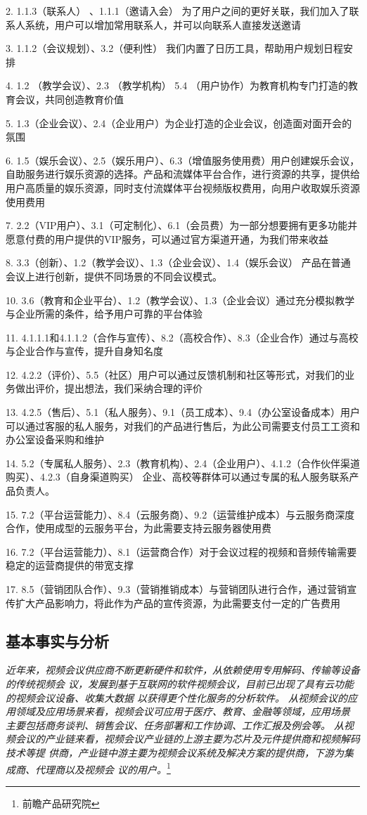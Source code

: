 \documentclass[a4paper,12pt]{article}
\begin{document}
    2. 1.1.3（联系人） 、1.1.1（邀请入会） 为了用户之间的更好关联，我们加入了联系人系统，用户可以增加常用联系人，并可以向联系人直接发送邀请

    3. 1.1.2（会议规划）、3.2（便利性） 我们内置了日历工具，帮助用户规划日程安排

    4. 1.2 （教学会议）、2.3 （教学机构） 5.4 （用户协作）为教育机构专门打造的教育会议，共同创造教育价值

    5. 1.3（企业会议）、2.4（企业用户）为企业打造的企业会议，创造面对面开会的氛围

    6. 1.5（娱乐会议）、2.5（娱乐用户）、6.3（增值服务使用费）用户创建娱乐会议，自助服务进行娱乐资源的选择。产品和流媒体平台合作，进行资源的共享，提供给用户高质量的娱乐资源，同时支付流媒体平台视频版权费用，向用户收取娱乐资源使用费用

    7. 2.2（VIP用户）、3.1（可定制化）、6.1（会员费）为一部分想要拥有更多功能并愿意付费的用户提供的VIP服务，可以通过官方渠道开通，为我们带来收益

    8. 3.3（创新）、1.2（教学会议）、1.3（企业会议）、1.4（娱乐会议） 产品在普通会议上进行创新，提供不同场景的不同会议模式。

    10. 3.6（教育和企业平台）、1.2（教学会议）、1.3（企业会议）通过充分模拟教学与企业所需的条件，给予用户可靠的平台体验

    11. 4.1.1.1和4.1.1.2（合作与宣传）、8.2（高校合作）、8.3（企业合作）通过与高校与企业合作与宣传，提升自身知名度

    12. 4.2.2（评价）、5.5（社区）用户可以通过反馈机制和社区等形式，对我们的业务做出评价，提出想法，我们采纳合理的评价

    13. 4.2.5（售后）、5.1（私人服务）、9.1（员工成本）、9.4（办公室设备成本）用户可以通过客服的私人服务，对我们的产品进行售后，为此公司需要支付员工工资和办公室设备采购和维护

    14. 5.2（专属私人服务）、2.3（教育机构）、2.4（企业用户）、4.1.2（合作伙伴渠道购买）、4.2.3（自身渠道购买） 企业、高校等群体可以通过专属的私人服务联系产品负责人。

    15. 7.2（平台运营能力）、8.4（云服务商）、9.2（运营维护成本）与云服务商深度合作，使用成型的云服务平台，为此需要支持云服务器使用费

    16. 7.2（平台运营能力）、8.1（运营商合作）对于会议过程的视频和音频传输需要稳定的运营商提供的带宽支撑

    17. 8.5（营销团队合作）、9.3（营销推销成本）与营销团队进行合作，通过营销宣传扩大产品影响力，将此作为产品的宣传资源，为此需要支付一定的广告费用
    \subsection{基本事实与分析}
    \textit{近年来，视频会议供应商不断更新硬件和软件，从依赖使用专用解码、传输等设备的传统视频会
    议，发展到基于互联网的软件视频会议，目前已出现了具有云功能的视频会议设备、收集大数据
    以获得更个性化服务的分析软件。
    从视频会议的应用领域及应用场景来看，视频会议可应用于医疗、教育、金融等领域，应用场景
    主要包括商务谈判、销售会议、任务部署和工作协调、工作汇报及例会等。
    从视频会议的产业链来看，视频会议产业链的上游主要为芯片及元件提供商和视频解码技术等提
    供商，产业链中游主要为视频会议系统及解决方案的提供商，下游为集成商、代理商以及视频会
    议的用户。}\footnote{前瞻产品研究院}
\end{document}
